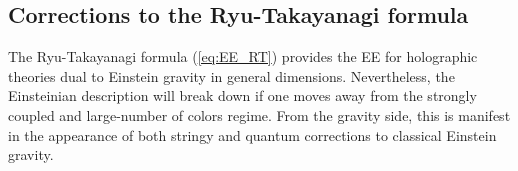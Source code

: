 \documentclass[twocolumn]{revtex4-2}
\providecommand{\eq}[2]{
    \begin{equation}
        #2
    \label{eq:#1}
    \end{equation}
}
\begin{document}




\subsection{Corrections to the Ryu-Takayanagi formula} \label{ss:EE_HO}

The Ryu-Takayanagi formula (\ref{eq:EE_RT}) provides the EE for holographic theories dual to Einstein gravity in general dimensions. Nevertheless, the Einsteinian description will break down if one moves away from the strongly coupled and large-number of colors regime. From the gravity side, this is manifest in the appearance of both stringy and quantum corrections to classical Einstein gravity.
\end{document}
